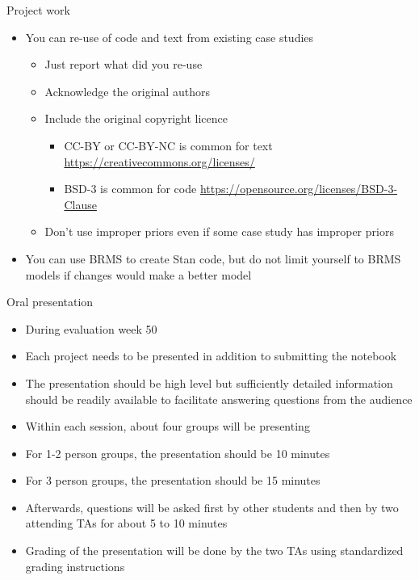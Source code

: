 \documentclass[t]{beamer}
\begin{document}
\begin{frame}
  
  {\Large\color{navyblue} Project work}
  
  \begin{itemize}
  \item You can re-use of code and text from existing case studies
    \begin{itemize}
    \item Just report what did you re-use
    \item Acknowledge the original authors
    \item Include the original copyright licence
      \begin{itemize}
      \item CC-BY or CC-BY-NC is common for text
        \url{https://creativecommons.org/licenses/}
      \item BSD-3 is common for code
        \url{https://opensource.org/licenses/BSD-3-Clause}
      \end{itemize}
    \item Don't use improper priors even if some case study has improper priors
  \end{itemize}
  \item You can use BRMS to create Stan code, but do not limit yourself
    to BRMS models if changes would make a better model
  \end{itemize}
\end{frame}

\begin{frame}
  
  {\Large\color{navyblue} Oral presentation}
  
  \begin{itemize}
  \item During evaluation week 50
  \item Each project needs to be presented in addition to submitting the notebook
  \item The presentation should be high level but sufficiently detailed information should be readily available to facilitate answering questions from the audience
  \item Within each session, about four groups will be presenting
  \item For 1-2 person groups, the presentation should be 10 minutes
  \item For 3 person groups, the presentation should be 15 minutes 
  \item Afterwards, questions will be asked first by other students and then by two attending TAs for about 5 to 10 minutes
  \item Grading of the presentation will be done by the two TAs using standardized grading instructions
  \end{itemize}
\end{frame}
\end{document}
